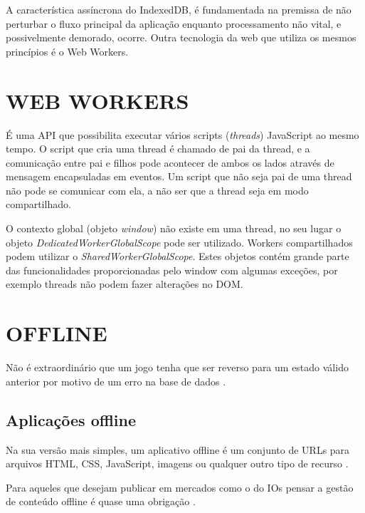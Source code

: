 
A característica assíncrona do IndexedDB, é fundamentada na
premissa de não perturbar o fluxo principal da aplicação enquanto
processamento não vital, e possivelmente demorado, ocorre. Outra
tecnologia da web que utiliza os mesmos princípios é o Web Workers.

\section{WEB WORKERS}

É uma API que possibilita executar vários scripts
(\textit{threads}) JavaScript ao mesmo tempo. O script que cria uma
thread é chamado de pai da thread, e a comunicação entre pai e filhos
pode acontecer de ambos os lados através de mensagem encapsuladas
em eventos. Um script que não seja pai de uma thread não pode se
comunicar com ela, a não ser que a thread seja em modo compartilhado.

O contexto global (objeto \textit{window}) não existe em uma
thread, no seu lugar o objeto \textit{DedicatedWorkerGlobalScope}
pode ser utilizado. Workers compartilhados podem utilizar o
\textit{SharedWorkerGlobalScope}. Estes objetos contém grande parte das
funcionalidades proporcionadas pelo window com algumas exceções, por
exemplo threads não podem fazer alterações no DOM.

\section{OFFLINE}
\begin{draft}
Não é extraordinário que um jogo tenha que ser reverso para um estado
válido anterior por motivo de um erro na base de dados \autocite[pp.
5]{browserGamesTechnologyAndFuture}.

\subsection{Aplicações offline}
Na sua versão mais simples, um aplicativo offline é um conjunto de
URLs para arquivos HTML, CSS, JavaScript, imagens ou qualquer outro tipo
de recurso \autocite{diveIntohtml}.

Para aqueles que desejam publicar em mercados como o do IOs pensar 
a gestão de conteúdo offline é quase uma obrigação \autocite{publishHtml5}.

\end{draft}

